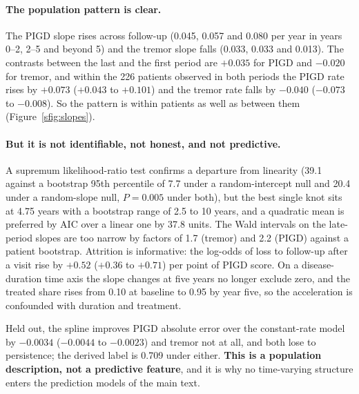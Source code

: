 \paragraph{The population pattern is clear.} The PIGD slope rises across follow-up
(0.045, 0.057 and 0.080 per year in years 0--2, 2--5 and beyond 5) and the tremor
slope falls (0.033, 0.033 and 0.013). The contrasts between the last and the first
period are $+0.035$ for PIGD and $-0.020$ for tremor, and within the 226 patients
observed in both periods the PIGD rate rises by $+0.073$ ($+0.043$ to $+0.101$)
and the tremor rate falls by $-0.040$ ($-0.073$ to $-0.008$). So the pattern is
within patients as well as between them (Figure~\ref{sfig:slopes}).

\paragraph{But it is not identifiable, not honest, and not predictive.} A
supremum likelihood-ratio test confirms a departure from linearity (39.1 against
a bootstrap 95th percentile of 7.7 under a random-intercept null and 20.4 under a
random-slope null, $P = 0.005$ under both), but the best single knot sits at 4.75
years with a bootstrap range of 2.5 to 10 years, and a quadratic mean is preferred
by AIC over a linear one by 37.8 units. The Wald intervals on the late-period
slopes are too narrow by factors of 1.7 (tremor) and 2.2 (PIGD) against a patient
bootstrap. Attrition is informative: the log-odds of loss to follow-up after a
visit rise by $+0.52$ ($+0.36$ to $+0.71$) per point of PIGD score. On a
disease-duration time axis the slope changes at five years no longer exclude zero,
and the treated share rises from 0.10 at baseline to 0.95 by year five, so the
acceleration is confounded with duration and treatment.

Held out, the spline improves PIGD absolute error over the constant-rate model by
$-0.0034$ ($-0.0044$ to $-0.0023$) and tremor not at all, and both lose to
persistence; the derived label is 0.709 under either. \textbf{This is a population
description, not a predictive feature}, and it is why no time-varying structure
enters the prediction models of the main text.

\begin{table}[htbp]
\centering
\caption{Time-varying rates of the two subscores, and the audit of their
identifiability and interval coverage.}
\label{stab:temporal}
\small

\end{table}

